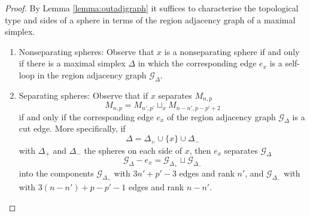 \documentclass[11pt]{article}
\theoremstyle{remark}
\theoremstyle{definition}
\begin{document}
\begin{proof}
    By Lemma \ref{lemma:outadjgraph}
    it suffices to characterise the topological type and sides of a sphere in terms of the region adjacency graph of a maximal simplex.
    \begin{enumerate}[$\cdot$]
    \item Nonseparating spheres:
    Observe that $x$ is a nonseparating sphere if and only if there is a maximal simplex $\Delta$ in which the corresponding edge $e_x$ is a self-loop in the region adjacency graph $\mathcal G_\Delta$.
    \item Separating spheres:
    Observe that if $x$ separates $M_{n,p}$
    $$
    M_{n,p} = M_{n',p'} \sqcup_x M_{n-n',p-p'+2}
    $$
    if and only if the corresponding edge $e_x$ of the region
    adjacency graph $\mathcal G_\Delta$ is a cut edge.
    More specifically, if
    $$
    \Delta=\Delta_+ \cup \{x\} \cup \Delta_-
    $$
     with $\Delta_+$ and $\Delta_-$ the spheres on each side of $x$,
     then $e_x$ separates $\mathcal G_\Delta$
     $$
     \mathcal G_\Delta - e_x = \mathcal G_{\Delta_+} \sqcup \mathcal G_{\Delta_-}
     $$
     into the components $\mathcal G_{\Delta_+}$
     with $3n'+p'-3$ edges and rank $n'$,
     and $\mathcal G_{\Delta_-}$ with
     with $3(n-n')+p-p'-1$ edges and rank $n-n'$.
  \end{enumerate}
\end{proof}
\end{document}
